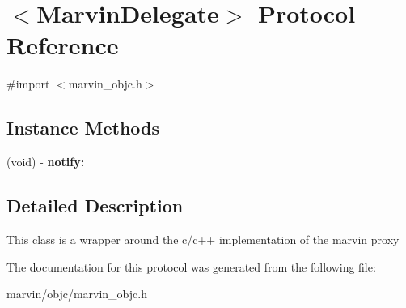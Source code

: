 \hypertarget{protocol_marvin_delegate-p}{}\section{$<$Marvin\+Delegate$>$ Protocol Reference}
\label{protocol_marvin_delegate-p}


{\ttfamily \#import $<$marvin\+\_\+objc.\+h$>$}

\subsection*{Instance Methods}
\begin{DoxyCompactItemize}
\item 
\mbox{\label{protocol_marvin_delegate-p_a0d53e9f0e09747b53ecbde78e3effac3}} 
(void) -\/ {\bfseries notify\+:}
\end{DoxyCompactItemize}


\subsection{Detailed Description}
This class is a wrapper around the c/c++ implementation of the marvin proxy 

The documentation for this protocol was generated from the following file\+:\begin{DoxyCompactItemize}
\item 
marvin/objc/marvin\+\_\+objc.\+h\end{DoxyCompactItemize}
